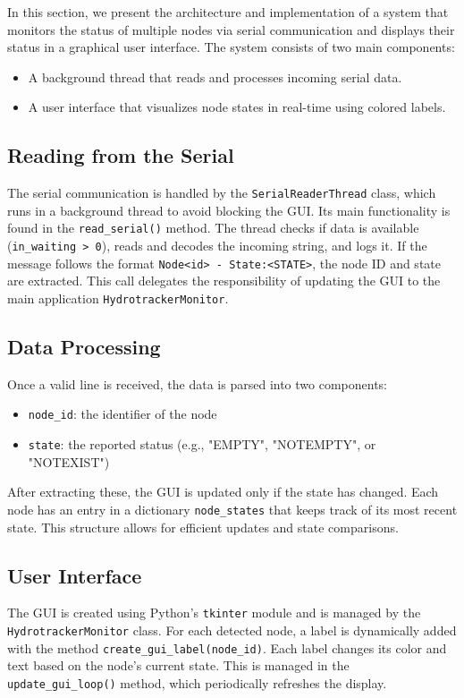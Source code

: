 In this section, we present the architecture and implementation of a system that monitors the status of multiple nodes via serial communication and displays their status in a graphical user interface. The system consists of two main components:
\begin{itemize}
    \item A background thread that reads and processes incoming serial data.
    \item A user interface that visualizes node states in real-time using colored labels.
\end{itemize}

\subsection{Reading from the Serial}

The serial communication is handled by the \texttt{SerialReaderThread} class, which runs in a background thread to avoid blocking the GUI. Its main functionality is found in the \texttt{read\_serial()} method. The thread checks if data is available (\texttt{in\_waiting > 0}), reads and decodes the incoming string, and logs it. If the message follows the format \texttt{Node<id> - State:<STATE>}, the node ID and state are extracted. This call delegates the responsibility of updating the GUI to the main application \texttt{HydrotrackerMonitor}.

\subsection{Data Processing}
Once a valid line is received, the data is parsed into two components:
\begin{itemize}
    \item \texttt{node\_id}: the identifier of the node
    \item \texttt{state}: the reported status (e.g., "EMPTY", "NOTEMPTY", or "NOTEXIST")
\end{itemize}
After extracting these, the GUI is updated only if the state has changed. Each node has an entry in a dictionary \texttt{node\_states} that keeps track of its most recent state. This structure allows for efficient updates and state comparisons.

\subsection{User Interface}
The GUI is created using Python's \texttt{tkinter} module and is managed by the \texttt{HydrotrackerMonitor} class. For each detected node, a label is dynamically added with the method \texttt{create\_gui\_label(node\_id)}. Each label changes its color and text based on the node's current state. This is managed in the \texttt{update\_gui\_loop()} method, which periodically refreshes the display.

